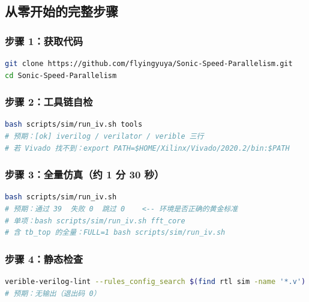 \documentclass[withoutpreface,bwprint]{cumcmthesis}
\begin{document}
\subsection{从零开始的完整步骤}

\subsubsection{步骤 1：获取代码}
\begin{lstlisting}[language=bash, basicstyle=\ttfamily\zihao{6},
                   frame=single, rulecolor=\color{boxFrame}]
git clone https://github.com/flyingyuya/Sonic-Speed-Parallelism.git
cd Sonic-Speed-Parallelism
\end{lstlisting}

\subsubsection{步骤 2：工具链自检}
\begin{lstlisting}[language=bash, basicstyle=\ttfamily\zihao{6},
                   frame=single, rulecolor=\color{boxFrame}]
bash scripts/sim/run_iv.sh tools
# 预期：[ok] iverilog / verilator / verible 三行
# 若 Vivado 找不到：export PATH=$HOME/Xilinx/Vivado/2020.2/bin:$PATH
\end{lstlisting}

\subsubsection{步骤 3：全量仿真（约 1 分 30 秒）}
\begin{lstlisting}[language=bash, basicstyle=\ttfamily\zihao{6},
                   frame=single, rulecolor=\color{boxFrame}]
bash scripts/sim/run_iv.sh
# 预期：通过 39  失败 0  跳过 0    <-- 环境是否正确的黄金标准
# 单项：bash scripts/sim/run_iv.sh fft_core
# 含 tb_top 的全量：FULL=1 bash scripts/sim/run_iv.sh
\end{lstlisting}

\subsubsection{步骤 4：静态检查}
\begin{lstlisting}[language=bash, basicstyle=\ttfamily\zihao{6},
                   frame=single, rulecolor=\color{boxFrame}]
verible-verilog-lint --rules_config_search $(find rtl sim -name '*.v')
# 预期：无输出（退出码 0）
\end{lstlisting}
\end{document}
